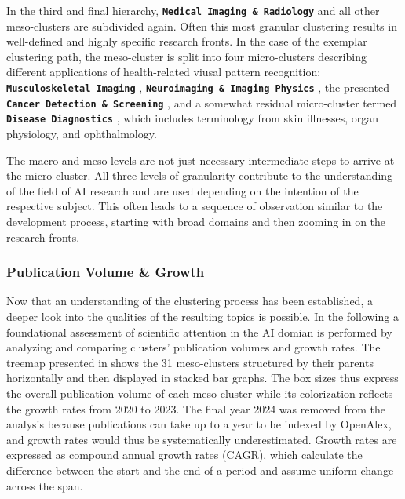 \documentclass{article}
\begin{document}
	In the third and final hierarchy, \textbf{\texttt{Medical Imaging \& Radiology}}  and all other meso-clusters are subdivided again. Often this most granular clustering results in well-defined and highly specific research fronts. In the case of the exemplar clustering path, the meso-cluster is split into four micro-clusters describing different applications of health-related viusal pattern recognition: \textbf{\texttt{Musculoskeletal Imaging}} , \textbf{\texttt{Neuroimaging \& Imaging Physics}} , the presented \textbf{\texttt{Cancer Detection \& Screening}} , and a somewhat residual micro-cluster termed \textbf{\texttt{Disease Diagnostics}} , which includes terminology from skin illnesses, organ physiology, and ophthalmology.
	
	The macro and meso-levels are not just necessary intermediate steps to arrive at the micro-cluster. All three levels of granularity contribute to the understanding of the field of AI research and are used depending on the intention of the respective subject. This often leads to a sequence of observation similar to the development process, starting with broad domains and then zooming in on the research fronts.
	
	
	\subsubsection{Publication Volume \& Growth}
	\label{cluster_size_meso_level}
	
	Now that an understanding of the clustering process has been established, a deeper look into the qualities of the resulting topics is possible. In the following a foundational assessment of scientific attention in the AI domian is performed by analyzing and comparing clusters' publication volumes and growth rates. The treemap presented in  shows the 31 meso-clusters structured by their parents horizontally and then displayed in stacked bar graphs. The box sizes thus express the overall publication volume of each meso-cluster while its colorization reflects the growth rates from 2020 to 2023. The final year 2024 was removed from the analysis because publications can take up to a year to be indexed by OpenAlex, and growth rates would thus be systematically underestimated. Growth rates are expressed as compound annual growth rates (CAGR), which calculate the difference between the start and the end of a period and assume uniform change across the span.
	
\end{document}
